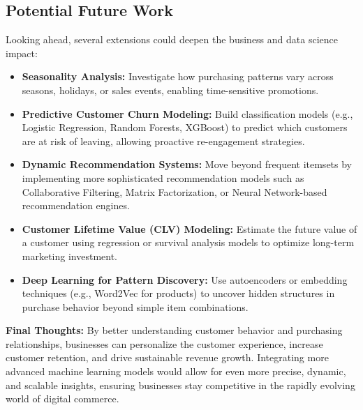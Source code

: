 \documentclass[12pt]{article}
\begin{document}
\vspace{0.4cm}

\subsection*{Potential Future Work}

Looking ahead, several extensions could deepen the business and data science impact:

\begin{itemize}
    \item \textbf{Seasonality Analysis:}  
    Investigate how purchasing patterns vary across seasons, holidays, or sales events, enabling time-sensitive promotions.
    
    \item \textbf{Predictive Customer Churn Modeling:}  
    Build classification models (e.g., Logistic Regression, Random Forests, XGBoost) to predict which customers are at risk of leaving, allowing proactive re-engagement strategies.
    
    \item \textbf{Dynamic Recommendation Systems:}  
    Move beyond frequent itemsets by implementing more sophisticated recommendation models such as Collaborative Filtering, Matrix Factorization, or Neural Network-based recommendation engines.
    
    \item \textbf{Customer Lifetime Value (CLV) Modeling:}  
    Estimate the future value of a customer using regression or survival analysis models to optimize long-term marketing investment.
    
    \item \textbf{Deep Learning for Pattern Discovery:}  
    Use autoencoders or embedding techniques (e.g., Word2Vec for products) to uncover hidden structures in purchase behavior beyond simple item combinations.
\end{itemize}

\vspace{0.4cm}

\textbf{Final Thoughts:}  
By better understanding customer behavior and purchasing relationships, businesses can personalize the customer experience, increase customer retention, and drive sustainable revenue growth.  
Integrating more advanced machine learning models would allow for even more precise, dynamic, and scalable insights, ensuring businesses stay competitive in the rapidly evolving world of digital commerce.
\end{document}

